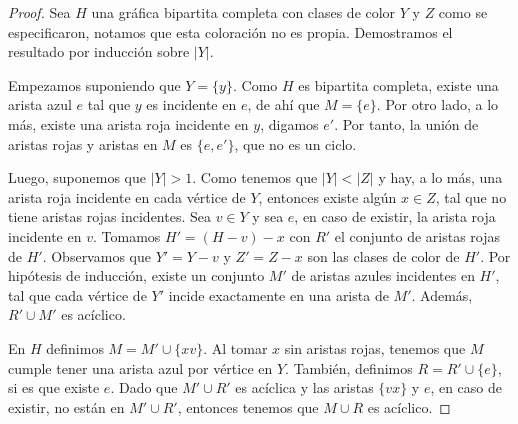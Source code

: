 \begin{proof}
    Sea $H$ una gr\'afica bipartita completa con clases de color $Y$ y $Z$ como
    se especificaron, notamos que esta coloraci\'on no es propia. Demostramos el
    resultado por inducci\'on sobre $|Y|$. 

    Empezamos suponiendo que $Y=\{y\}$. Como $H$ es bipartita completa, existe
    una arista azul $e$ tal que $y$ es incidente en $e$, de ah\'i que $M = \{ e
    \}$. Por otro lado, a lo m\'as, existe una arista roja incidente en $y$,
    digamos $e'$. Por tanto, la uni\'on de aristas rojas y aristas en $M$ es
    $\{e, e'\}$, que no es un ciclo.

    Luego, suponemos que $|Y|>1$. Como tenemos que $|Y|<|Z|$ y hay, a lo m\'as,
    una arista roja incidente en cada v\'ertice de $Y$, entonces existe alg\'un
    $x \in Z$, tal que no tiene aristas rojas incidentes. Sea $v \in Y$ y sea
    $e$, en caso de existir, la arista roja incidente en $v$. Tomamos $H'=
    (H-v)-x$ con $R'$ el conjunto de aristas rojas de $H'$. Observamos que $Y' =
    Y- v$ y $Z'= Z- x$ son las clases de color de $H'$. Por hip\'otesis de
    inducci\'on, existe un conjunto $M'$ de aristas azules incidentes en $H'$,
    tal que cada v\'ertice de $Y'$ incide exactamente en una arista de $M'$.
    Adem\'as, $R'\cup M'$ es ac\'iclico.
    
    En $H$ definimos $M = M'\cup \{xv\}$. Al tomar $x$ sin aristas rojas,
    tenemos que $M$ cumple tener una arista azul por v\'ertice en $Y$.
    Tambi\'en, definimos $R= R'\cup \{ e \}$, si es que existe $e$.  Dado que
    $M'\cup R'$ es ac\'iclica y las aristas $\{vx\}$ y $e$, en caso de existir,
    no est\'an en $M'\cup R'$, entonces tenemos que $M \cup R$ es ac\'iclico.
\end{proof}

